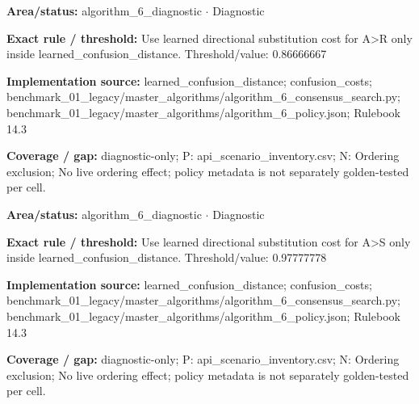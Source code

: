 \begin{tcolorbox}[enhanced,breakable,colback=white,colframe=Muted!45,boxrule=0.45pt,arc=1.5pt,left=6pt,right=6pt,top=5pt,bottom=5pt,title={\texttt{A6-LEARNED-SUBSTITUTION-A-R}},title after break={\texttt{A6-LEARNED-SUBSTITUTION-A-R}\ (continued)},fonttitle=\headingfont\bfseries\color{Navy},coltitle=Navy]
\textbf{Area/status:} algorithm\_\allowbreak{}6\_\allowbreak{}diagnostic $\boldsymbol{\cdot}$ Diagnostic\par
\smallskip
\textbf{Exact rule / threshold:} Use learned directional substitution cost for A>R only inside learned\_\allowbreak{}confusion\_\allowbreak{}distance. Threshold/\allowbreak{}value: 0.86666667\par
\smallskip
\textbf{Implementation source:} learned\_\allowbreak{}confusion\_\allowbreak{}distance; confusion\_\allowbreak{}costs; benchmark\_\allowbreak{}01\_\allowbreak{}legacy/\allowbreak{}master\_\allowbreak{}algorithms/\allowbreak{}algorithm\_\allowbreak{}6\_\allowbreak{}consensus\_\allowbreak{}search.py; benchmark\_\allowbreak{}01\_\allowbreak{}legacy/\allowbreak{}master\_\allowbreak{}algorithms/\allowbreak{}algorithm\_\allowbreak{}6\_\allowbreak{}policy.json; Rulebook 14.3\par
\smallskip
\textbf{Coverage / gap:} diagnostic-only; P: api\_\allowbreak{}scenario\_\allowbreak{}inventory.csv; N: Ordering exclusion; No live ordering effect; policy metadata is not separately golden-tested per cell.
\end{tcolorbox}
\begin{tcolorbox}[enhanced,breakable,colback=white,colframe=Muted!45,boxrule=0.45pt,arc=1.5pt,left=6pt,right=6pt,top=5pt,bottom=5pt,title={\texttt{A6-LEARNED-SUBSTITUTION-A-S}},title after break={\texttt{A6-LEARNED-SUBSTITUTION-A-S}\ (continued)},fonttitle=\headingfont\bfseries\color{Navy},coltitle=Navy]
\textbf{Area/status:} algorithm\_\allowbreak{}6\_\allowbreak{}diagnostic $\boldsymbol{\cdot}$ Diagnostic\par
\smallskip
\textbf{Exact rule / threshold:} Use learned directional substitution cost for A>S only inside learned\_\allowbreak{}confusion\_\allowbreak{}distance. Threshold/\allowbreak{}value: 0.97777778\par
\smallskip
\textbf{Implementation source:} learned\_\allowbreak{}confusion\_\allowbreak{}distance; confusion\_\allowbreak{}costs; benchmark\_\allowbreak{}01\_\allowbreak{}legacy/\allowbreak{}master\_\allowbreak{}algorithms/\allowbreak{}algorithm\_\allowbreak{}6\_\allowbreak{}consensus\_\allowbreak{}search.py; benchmark\_\allowbreak{}01\_\allowbreak{}legacy/\allowbreak{}master\_\allowbreak{}algorithms/\allowbreak{}algorithm\_\allowbreak{}6\_\allowbreak{}policy.json; Rulebook 14.3\par
\smallskip
\textbf{Coverage / gap:} diagnostic-only; P: api\_\allowbreak{}scenario\_\allowbreak{}inventory.csv; N: Ordering exclusion; No live ordering effect; policy metadata is not separately golden-tested per cell.
\end{tcolorbox}
